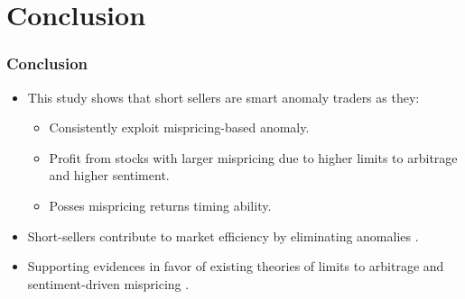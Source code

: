 \documentclass{beamer}
\begin{document}
	\section{Conclusion}
	\begin{frame}
		\frametitle{Conclusion}
		\begin{itemize}
		\item This study shows that short sellers are smart anomaly traders as they:
		\begin{itemize}
		\item Consistently exploit mispricing-based anomaly.
		\item Profit from stocks with larger mispricing due to higher limits to arbitrage and higher sentiment.
		\item Posses mispricing returns timing ability.
		\end{itemize}
		\item Short-sellers contribute to market efficiency by eliminating anomalies \citep{Hanson2014, Akbas2015, Mclean2016}.
		\item  Supporting evidences in favor of existing theories of limits to arbitrage \citep[][]{Shleifer1997, Pontiff2006, Stambaugh2015} and sentiment-driven mispricing \citep{Baker2006}.
		\end{itemize}
	\end{frame}  
%			
%
%
\end{document}
